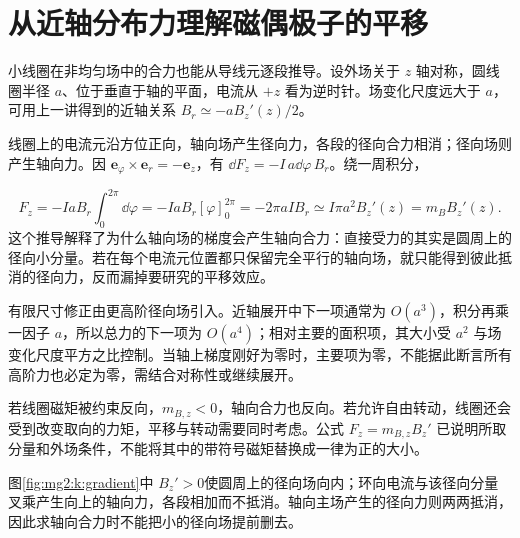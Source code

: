 \section{从近轴分布力理解磁偶极子的平移}
小线圈在非均匀场中的合力也能从导线元逐段推导。设外场关于 $z$ 轴对称，圆线圈半径 $a$、位于垂直于轴的平面，电流从 $+z$ 看为逆时针。场变化尺度远大于 $a$，可用上一讲得到的近轴关系 $B_r\simeq-aB_z'(z)/2$。


线圈上的电流元沿方位正向，轴向场产生径向力，各段的径向合力相消；径向场则产生轴向力。因 $\bm e_\varphi\times\bm e_r=-\bm e_z$，有 $\dd F_z=-I\,a\dd\varphi\,B_r$。绕一周积分，

\[
F_z=-IaB_r\int_0^{2\pi}\dd\varphi
=-IaB_r[\varphi]_0^{2\pi}
=-2\pi aIB_r\simeq I\pi a^2B_z'(z)=m_BB_z'(z).
\]
这个推导解释了为什么轴向场的梯度会产生轴向合力：直接受力的其实是圆周上的径向小分量。若在每个电流元位置都只保留完全平行的轴向场，就只能得到彼此抵消的径向力，反而漏掉要研究的平移效应。


有限尺寸修正由更高阶径向场引入。近轴展开中下一项通常为 $O(a^3)$，积分再乘一因子 $a$，所以总力的下一项为 $O(a^4)$；相对主要的面积项，其大小受 $a^2$ 与场变化尺度平方之比控制。当轴上梯度刚好为零时，主要项为零，不能据此断言所有高阶力也必定为零，需结合对称性或继续展开。


若线圈磁矩被约束反向，$m_{B,z}<0$，轴向合力也反向。若允许自由转动，线圈还会受到改变取向的力矩，平移与转动需要同时考虑。公式 $F_z=m_{B,z}B_z'$ 已说明所取分量和外场条件，不能将其中的带符号磁矩替换成一律为正的大小。


图\ref{fig:mg2:k:gradient}中 $B_z'>0$使圆周上的径向场向内；环向电流与该径向分量叉乘产生向上的轴向力，各段相加而不抵消。轴向主场产生的径向力则两两抵消，因此求轴向合力时不能把小的径向场提前删去。


